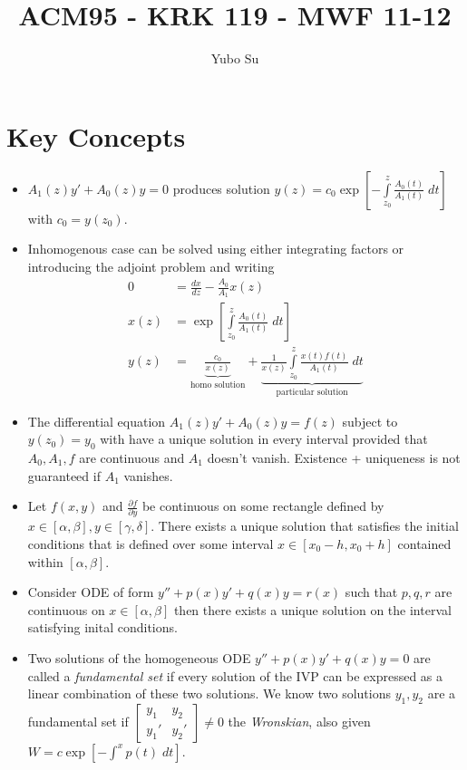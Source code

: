 \documentclass[10pt]{report}
\newcommand{\rd}[2]{\frac{d#1}{d#2}}
\newcommand{\pd}[2]{\frac{\partial #1}{\partial#2}}
\begin{document}
\pagestyle{fancy}
\title{ACM95 - KRK 119 - MWF 11-12}
\author{Yubo Su}
\date{ }

\maketitle

\tableofcontents

\chapter{Key Concepts}

\begin{itemize}
    \item $A_1(z)y' + A_0(z)y = 0$ produces solution $y(z) = c_0\exp\left[ -\displaystyle\int\limits_{z_0}^{z}\frac{A_0(t)}{A_1(t)}\;dt \right]$ with $c_0 = y(z_0)$.
    \item Inhomogenous case can be solved using either integrating factors or introducing the adjoint problem and writing
        \begin{align*}
            0 &= \rd{x}{z} - \frac{A_0}{A_1}x(z) \\
            x(z) &= \exp\left[ \displaystyle\int\limits_{z_0}^{z}\frac{A_0(t)}{A_1(t)}\;dt \right]\\
            y(z) &= \underbrace{\frac{c_0}{x(z)}}_{\text{homo solution}} + \underbrace{\frac{1}{x(z)}\displaystyle\int\limits_{z_0}^{z}\frac{x(t)f(t)}{A_1(t)}\;dt}_{\text{particular solution}}
        \end{align*}
    \item The differential equation $A_1(z) y' + A_0(z)y = f(z)$ subject to $y(z_0) = y_0$ with have a unique solution in every interval provided that $A_0, A_1, f$ are continuous and $A_1$ doesn't vanish. Existence + uniqueness is not guaranteed if $A_1$ vanishes.
    \item Let $f(x,y)$ and $\pd{f}{y}$ be continuous on some rectangle defined by $x \in [\alpha,\beta], y \in [\gamma,\delta]$. There exists a unique solution that satisfies the initial conditions that is defined over some interval $x \in [x_0 -h, x_0 + h]$ contained within $[\alpha,\beta]$.
    \item Consider ODE of form $y'' + p(x)y' + q(x)y = r(x)$ such that $p,q,r$ are continuous on $x \in [\alpha,\beta]$ then there exists a unique solution on the interval satisfying inital conditions.
    \item Two solutions of the homogeneous ODE $y'' + p(x)y' + q(x)y = 0$ are called a \emph{fundamental set} if every solution of the IVP can be expressed as a linear combination of these two solutions. We know two solutions $y_1, y_2$ are a fundamental set if $\begin{bmatrix} y_1 & y_2\\y_1' & y_2' \end{bmatrix} \neq 0$ the \emph{Wronskian}, also given $W = c\exp\left[ -\int^x p(t)\; dt \right]$.

\end{itemize}
\end{document}
